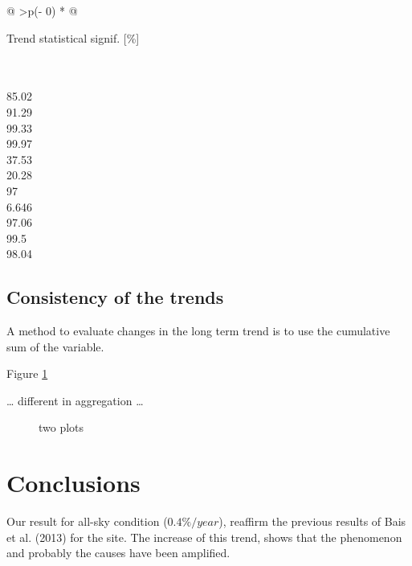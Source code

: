 \documentclass[
  preprint, 3p, authoryear]{article}
\begin{document}
\begin{longtable}[]{@{}
  >{\centering\arraybackslash}p{(\columnwidth - 0\tabcolsep) * }@{}}
\toprule
\begin{minipage}[b]{\linewidth}\centering
Trend statistical signif. {[}\%{]}
\end{minipage} \\
\midrule
{} \\
85.02 \\
91.29 \\
99.33 \\
99.97 \\
37.53 \\
20.28 \\
97 \\
6.646 \\
97.06 \\
99.5 \\
98.04 \\
\bottomrule
\end{longtable}

\hypertarget{consistency-of-the-trends}{%
\subsection{Consistency of the trends}\label{consistency-of-the-trends}}

A method to evaluate changes in the long term trend is to use the cumulative sum of the variable.

Figure \ref{fig:cumsum}

\ldots{} different in aggregation \ldots{}

\begin{figure}[h!]

{\centering {}

}

\caption{two plots}\label{fig:cumsum}
\end{figure}

\hypertarget{conclusions}{%
\section{Conclusions}\label{conclusions}}

Our result for all-sky condition (\(0.4\%/year\)), reaffirm the previous results of Bais et al. (2013) for the site.
The increase of this trend, shows that the phenomenon and probably the causes have been amplified.
\end{document}
